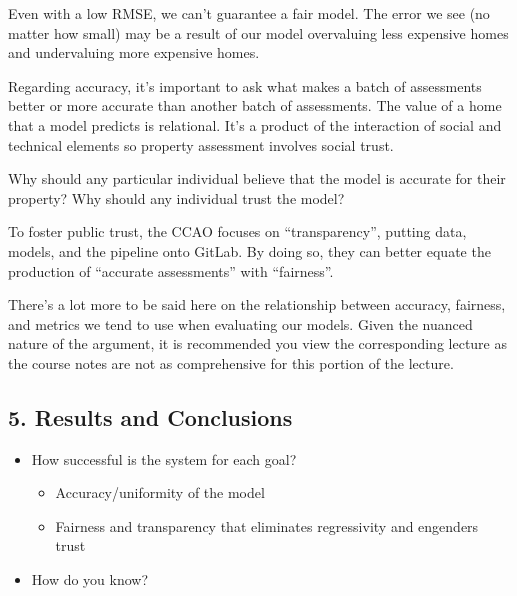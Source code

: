 \documentclass[
  letterpaper,
  DIV=11,
  numbers=noendperiod]{scrreprt}
\providecommand{\tightlist}{%
  \setlength{\itemsep}{0pt}\setlength{\parskip}{0pt}}\usepackage{longtable,booktabs,array}
\begin{document}
Even with a low RMSE, we can't guarantee a fair model. The error we see
(no matter how small) may be a result of our model overvaluing less
expensive homes and undervaluing more expensive homes.

Regarding accuracy, it's important to ask what makes a batch of
assessments better or more accurate than another batch of assessments.
The value of a home that a model predicts is relational. It's a product
of the interaction of social and technical elements so property
assessment involves social trust.

Why should any particular individual believe that the model is accurate
for their property? Why should any individual trust the model?

To foster public trust, the CCAO focuses on ``transparency'', putting
data, models, and the pipeline onto GitLab. By doing so, they can better
equate the production of ``accurate assessments'' with ``fairness''.

There's a lot more to be said here on the relationship between accuracy,
fairness, and metrics we tend to use when evaluating our models. Given
the nuanced nature of the argument, it is recommended you view the
corresponding lecture as the course notes are not as comprehensive for
this portion of the lecture.

\subsection{5. Results and Conclusions}\label{results-and-conclusions}

\begin{tcolorbox}[enhanced jigsaw, arc=.35mm, colbacktitle=quarto-callout-note-color!10!white, coltitle=black, bottomrule=.15mm, leftrule=.75mm, bottomtitle=1mm, colback=white, toptitle=1mm, breakable, titlerule=0mm, rightrule=.15mm, colframe=quarto-callout-note-color-frame, opacitybacktitle=0.6, left=2mm, title=\textcolor{quarto-callout-note-color}{\faInfo}\hspace{0.5em}{Driving Questions}, toprule=.15mm, opacityback=0]

\begin{itemize}
\tightlist
\item
  How successful is the system for each goal?

  \begin{itemize}
  \tightlist
  \item
    Accuracy/uniformity of the model
  \item
    Fairness and transparency that eliminates regressivity and engenders
    trust
  \end{itemize}
\item
  How do you know?
\end{itemize}

\end{tcolorbox}
\end{document}
